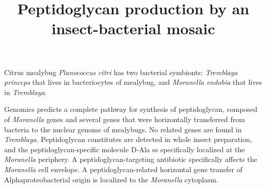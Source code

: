 \documentclass[11pt]{article}
\title{Peptidoglycan production by an insect-bacterial mosaic}
\author{}
\date{}
\begin{document}
\begin{sloppypar}
  \maketitle

  \linenumbers
Citrus mealybug \textit{Planococcus citri} has two bacterial symbionts: \textit{Tremblaya princeps} that lives in bacteriocytes of mealybug, and \textit{Moranella endobia} that lives in \textit{Tremblaya}. 

\newline

Genomics predicts a complete pathway for synthesis of peptidoglycan, composed of \textit{Moranella} genes and several genes that were horizontally transferred from bacteria to the nuclear genome of mealybugs. 
No related genes are found in \textit{Tremblaya}. 
Peptidoglycan constitutes are detected in whole insect preparation, and the peptidoglycan-specific molecule D-Ala ss specifically localized at the \textit{Moranella} periphery. 
A peptidoglycan-targeting antibiotic specifically affects the \textit{Moranella} cell envelope. 
A peptidoglycan-related horizontal gene transfer of Alphaproteobacterial origin is localized to the \textit{Moranella} cytoplasm.

\newline


\end{sloppypar}
\end{document}
